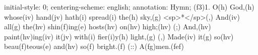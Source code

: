 initial-style: 0;
centering-scheme: english;
annotation: Hymn;
(f3)1. O(h) God,(h) whose(iv) hand(jv) hath(i) spread(i) the(h) sky,(g) <sp>*</sp>(,)
And(iv) all(g) the(hv) shin(f)ing(e) hosts(hv) on(hv) high;(hv) (;)
And,(hv) paint(hv)ing(iv) it(jv) with(i) fier(i)y(h) light,(g) (,)
Made(iv) it(g) so(hv) beau(f)teous(e) and(hv) so(f) bright.(f) (::) A(fg)men.(fef)
